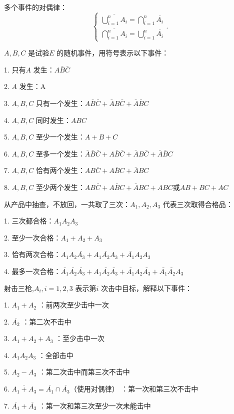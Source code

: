\begin{notation}
    多个事件的对偶律：
    \[
        \begin{cases}
            \displaystyle{\overline{\bigcup_{i=1}^n A_i}=\bigcap_{i=1}^n \overline{A_i}}\\
            \displaystyle{\overline{\bigcap_{i=1}^n A_i}=\bigcup_{i=1}^{n} \overline{A_i}}
        \end{cases}
    .\] 
\end{notation}
\begin{eg}[]
    $A,B,C$ 是试验$E$ 的随机事件，用符号表示以下事件：
    
    1. 只有$A$ 发生：$A\bar{B}\bar{C}$

    2. $A$ 发生：A

    3. $A,B,C$ 只有一个发生：$A\bar{B}\bar{C}+\bar{A}B\bar{C}+\bar{A}\bar{B}C$

    4. $A,B,C$ 同时发生：$ABC$ 

    5. $A,B,C$ 至少一个发生：$A+B+C$ 

    6. $A,B,C$ 至多一个发生：$\bar{A}\bar{B}\bar{C}+A\bar{B}\bar{C}+\bar{A}B\bar{C}+\bar{A}\bar{B}C$

    7. $A,B,C$ 恰有两个发生：$AB\bar{C}+A\bar{B}C+\bar{A}BC$

    8. $A,B,C$ 至少两个发生：$AB\bar{C}+A\bar{B}C+\bar{A}BC+ABC$或$AB+BC+AC$
\end{eg}
\begin{eg}[]
    从产品中抽查，不放回，一共取了三次：$A_1,A_2,A_3$ 代表三次取得合格品：

    1. 三次都合格：$A_1A_2A_3$ 
    
    2. 至少一次合格：$A_1+A_2+A_3$ 

    3. 恰有两次合格：$A_1A_2\bar{A_3}+A_1\bar{A_2}A_3+\bar{A_1}A_2A_3$

    4. 最多一次合格：$\bar{A_1}\bar{A_2}\bar{A_3}+A_1 \bar{A_2}\bar{A_3}+\bar{A_1}A_2 \bar{A_3}+\bar{A_1}\bar{A_2}A_3$
\end{eg}

\begin{eg}
    射击三枪,$A_i,i=1,2,3$ 表示第$i$ 次击中目标，解释以下事件：
    
    1. $A_1+A_2$ ：前两次至少击中一次

    2. $\overline{A_2}$ ：第二次不击中

    3. $A_1+A_2+A_3$ ：至少击中一次

    4. $A_1A_2A_3$ ：全部击中

    5. $A_2-A_3$ ：第二次击中而第三次不击中

    6. $\overline{A_1+A_3}=\overline{A_1}\cap \overline{A_3}$（使用对偶律） ：第一次和第三次不击中

    7. $\overline{A_1}+\overline{A_3}$ ：第一次和第三次至少一次未能击中
\end{eg}


